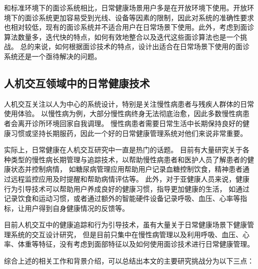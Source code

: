 和标准环境下的面诊系统相比，日常健康场景用户多是在开放环境下使用。开放环境下的面诊系统更加容易受到光线、设备等因素的限制，因此对系统的准确性要求也相对较低，现有的面诊系统并不适合用户在日常场景下使用。此外，考虑到面诊算法数量多，迭代快的特点，如何有效地整合以及迭代这些面诊算法也是一个挑战。
总的来说，如何根据面诊技术的特点，设计出适合在日常场景下使用的面诊系统还是一个亟待解决的问题。

\subsection{人机交互领域中的日常健康技术}
人机交互关注以人为中心的系统设计，特别是关注慢性病患者与残疾人群体的日常使用体验。
以慢性病为例，大部分慢性病终身无法彻底治愈，因此多数慢性病患者会离开诊所环境回家自我调理。
慢性病患者需要日常生活中长期保持良好的健康习惯或坚持长期服药，因此一个好的日常健康管理系统对他们来说非常重要。

实际上，日常健康在人机交互研究中一直是热门的话题。
目前有大量研究关于各种类型的慢性病长期管理与追踪技术，以帮助慢性病患者和医护人员了解患者的健康状态并控制病情，
如糖尿病管理应用帮助用户记录血糖控制饮食\cite{burgermaster2019personal}，精神患者通过远程监控应用及时提醒和帮助病情评估\cite{lazar2016evaluation}等。
此外，对于亚健康人员来说，健康行为引导技术可以帮助用户养成良好的健康习惯，指导更加健康的生活，
如通过记录饮食和运动习惯，或者通过额外的智能硬件设备记录呼吸、血压、心率等指标\cite{kay2012lullaby,gronvall2013beyond}，让用户得到自身健康情况的反馈等。

目前人机交互中的健康追踪和行为引导技术，虽有大量关于日常健康场景下健康管理系统的交互设计研究，
但是目前只集中在慢性病管理以及利用呼吸、血压、心率、体重等特征，没有考虑到面部特征以及如何使用面诊技术进行日常健康管理。

综合上述的相关工作和背景介绍，可以总结出本文的主要研究挑战分为以下三点：

